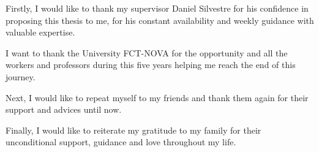 
%

\begin{ntacknowledgements}

Firstly, I would like to thank my supervisor Daniel Silvestre for his confidence in proposing this thesis to me, for his constant availability and weekly guidance with valuable expertise. \par
I want to thank the University FCT-NOVA for the opportunity and all the workers and professors during this five years helping me reach the end of this journey.\par
Next, I would like to repeat myself to my friends and thank them again for their support and advices until now. \par
Finally, I would like to reiterate my gratitude to my family for their unconditional support, guidance and love throughout my life.

\end{ntacknowledgements}